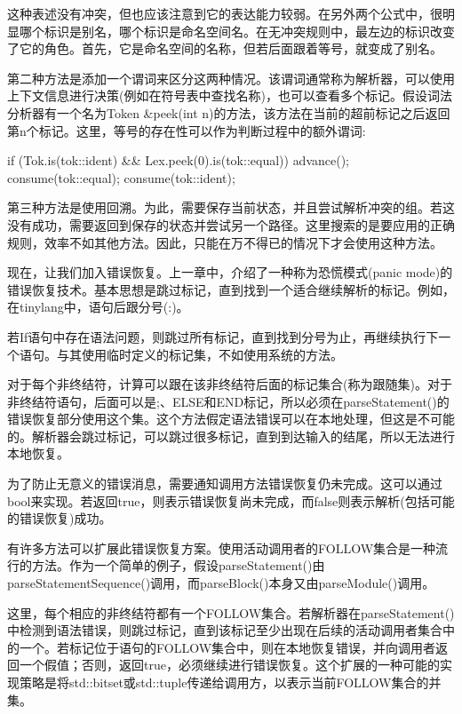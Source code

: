 这种表述没有冲突，但也应该注意到它的表达能力较弱。在另外两个公式中，很明显哪个标识是别名，哪个标识是命名空间名。在无冲突规则中，最左边的标识改变了它的角色。首先，它是命名空间的名称，但若后面跟着等号，就变成了别名。

第二种方法是添加一个谓词来区分这两种情况。该谓词通常称为解析器，可以使用上下文信息进行决策(例如在符号表中查找名称)，也可以查看多个标记。假设词法分析器有一个名为Token \&peek(int n)的方法，该方法在当前的超前标记之后返回第n个标记。这里，等号的存在性可以作为判断过程中的额外谓词:

\begin{cpp}
if (Tok.is(tok::ident) && Lex.peek(0).is(tok::equal)) {
    advance();
    consume(tok::equal);
}
consume(tok::ident);
\end{cpp}

第三种方法是使用回溯。为此，需要保存当前状态，并且尝试解析冲突的组。若这没有成功，需要返回到保存的状态并尝试另一个路径。这里搜索的是要应用的正确规则，效率不如其他方法。因此，只能在万不得已的情况下才会使用这种方法。

现在，让我们加入错误恢复。上一章中，介绍了一种称为恐慌模式(panic mode)的错误恢复技术。基本思想是跳过标记，直到找到一个适合继续解析的标记。例如，在tinylang中，语句后跟分号(:)。

若If语句中存在语法问题，则跳过所有标记，直到找到分号为止，再继续执行下一个语句。与其使用临时定义的标记集，不如使用系统的方法。

对于每个非终结符，计算可以跟在该非终结符后面的标记集合(称为跟随集)。对于非终结符语句，后面可以是;、ELSE和END标记，所以必须在parseStatement()的错误恢复部分使用这个集。这个方法假定语法错误可以在本地处理，但这是不可能的。解析器会跳过标记，可以跳过很多标记，直到到达输入的结尾，所以无法进行本地恢复。

为了防止无意义的错误消息，需要通知调用方法错误恢复仍未完成。这可以通过bool来实现。若返回true，则表示错误恢复尚未完成，而false则表示解析(包括可能的错误恢复)成功。

有许多方法可以扩展此错误恢复方案。使用活动调用者的FOLLOW集合是一种流行的方法。作为一个简单的例子，假设parseStatement()由parseStatementSequence()调用，而parseBlock()本身又由parseModule()调用。

这里，每个相应的非终结符都有一个FOLLOW集合。若解析器在parseStatement()中检测到语法错误，则跳过标记，直到该标记至少出现在后续的活动调用者集合中的一个。若标记位于语句的FOLLOW集合中，则在本地恢复错误，并向调用者返回一个假值；否则，返回true，必须继续进行错误恢复。这个扩展的一种可能的实现策略是将std::bitset或std::tuple传递给调用方，以表示当前FOLLOW集合的并集。

